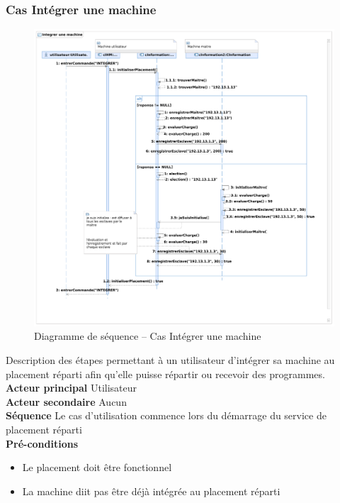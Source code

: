   \subsubsection{Cas Intégrer une machine}

    \begin{figure}[h!]
      \centering
      \includegraphics[width=\textwidth]{img/analyse_DSseqintegermach.pdf}
      \caption{Diagramme de séquence -- Cas Intégrer une machine}
    \end{figure}

    Description des étapes permettant à un utilisateur d'intégrer sa
    machine au placement réparti afin qu'elle puisse répartir ou
    recevoir des programmes. \\

    \noindent
    {\bf Acteur principal} Utilisateur \\
    {\bf Acteur secondaire} Aucun \\
    {\bf Séquence} Le cas d'utilisation commence lors du démarrage du
      service de placement réparti \\ 
    {\bf Pré-conditions} \hfill
    \begin{itemize}
      \item Le placement doit être fonctionnel
      \item La machine diit pas être déjà intégrée au placement réparti
    \end{itemize}


